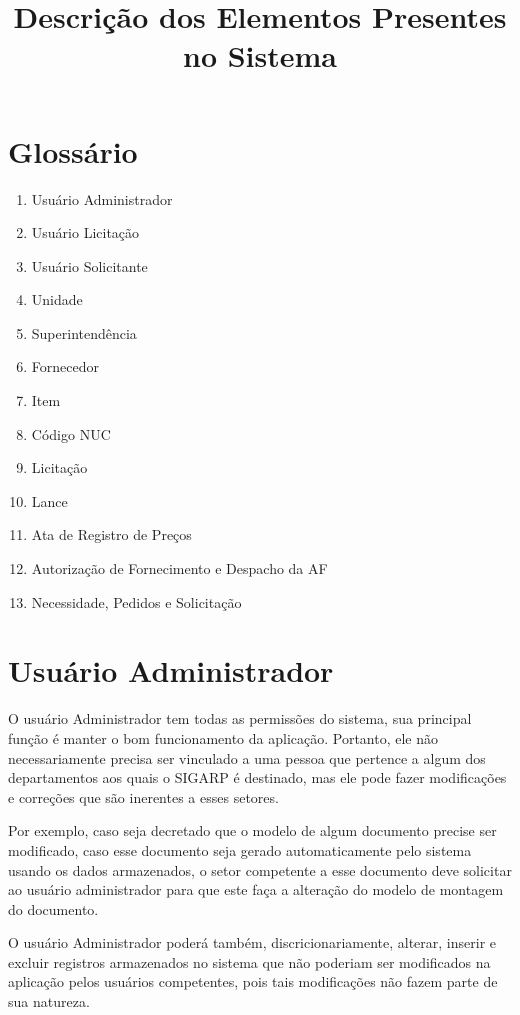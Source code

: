 \documentclass[ ]{article}
\title{Descrição dos Elementos Presentes no Sistema}
\date{}
\author{}
\begin{document}
\maketitle
\newpage
\section*{Glossário}
	\begin{enumerate}
		\item Usuário Administrador
		\item Usuário Licitação
		\item Usuário Solicitante
		\item Unidade
		\item Superintendência
		\item Fornecedor
		\item Item
		\item Código NUC
		\item Licitação
		\item Lance
		\item Ata de Registro de Preços
		\item Autorização de Fornecimento e Despacho da AF
		\item Necessidade, Pedidos e Solicitação
	\end{enumerate}
	
\section{Usuário Administrador}
	O usuário Administrador tem todas as permissões do sistema, sua principal função é manter o bom funcionamento da aplicação. Portanto, ele não necessariamente precisa ser vinculado a uma pessoa que pertence a algum dos departamentos aos quais o SIGARP é destinado, mas ele pode fazer modificações e correções que são inerentes a esses setores.

	Por exemplo, caso seja decretado que o modelo de algum documento precise ser modificado, caso esse documento seja gerado automaticamente pelo sistema usando os dados armazenados, o setor competente a esse documento deve solicitar ao usuário administrador para que este faça a alteração do modelo de montagem do documento.
	
	O usuário Administrador poderá também, discricionariamente, alterar, inserir e excluir registros armazenados no sistema que não poderiam ser modificados na aplicação pelos usuários competentes, pois tais modificações não fazem parte de sua natureza.
\end{document}
